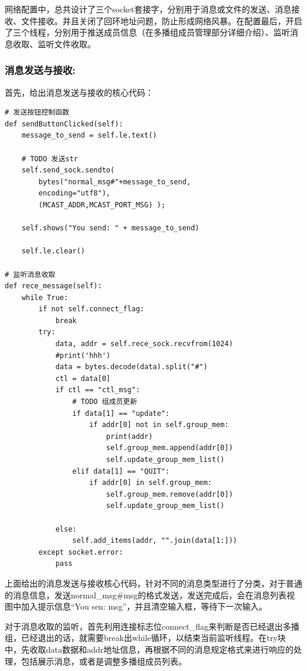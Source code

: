 \documentclass[UTF8]{ctexart}
\begin{document}
\par{网络配置中，总共设计了三个socket套接字，分别用于消息或文件的发送、消息接收、文件接收。并且关闭了回环地址问题，防止形成网络风暴。在配置最后，开启了三个线程，分别用于推送成员信息（在多播组成员管理部分详细介绍）、监听消息收取、监听文件收取。
}
\subsubsection{消息发送与接收:}{首先，给出消息发送与接收的核心代码：}
\par{
\begin{lstlisting}
# 发送按钮控制函数
def sendButtonClicked(self):
    message_to_send = self.le.text()

    # TODO 发送str
    self.send_sock.sendto(
    	bytes("normal_msg#"+message_to_send, 
    	encoding="utf8"), 
    	(MCAST_ADDR,MCAST_PORT_MSG) );

    self.shows("You send: " + message_to_send)

    self.le.clear()

# 监听消息收取
def rece_message(self):
    while True: 
        if not self.connect_flag:
            break
        try: 
            data, addr = self.rece_sock.recvfrom(1024) 
            #print('hhh')
            data = bytes.decode(data).split("#")
            ctl = data[0]
            if ctl == "ctl_msg":
                # TODO 组成员更新
                if data[1] == "update":
                    if addr[0] not in self.group_mem:
                        print(addr)
                        self.group_mem.append(addr[0])
                        self.update_group_mem_list()
                elif data[1] == "QUIT":
                    if addr[0] in self.group_mem:
                        self.group_mem.remove(addr[0])
                        self.update_group_mem_list()

            else:
                self.add_items(addr, "".join(data[1:]))
        except socket.error: 
            pass 
\end{lstlisting}
}
\par{上面给出的消息发送与接收核心代码，针对不同的消息类型进行了分类，对于普通的消息信息，发送normal\_msg\#msg的格式发送，发送完成后，会在消息列表视图中加入提示信息“You sen: msg”，并且清空输入框，等待下一次输入。}
\par{对于消息收取的监听，首先利用连接标志位connect\_flag来判断是否已经退出多播组，已经退出的话，就需要break出while循环，以结束当前监听线程。在try块中，先收取data数据和addr地址信息，再根据不同的消息规定格式来进行响应的处理，包括展示消息，或者是调整多播组成员列表。
}
\end{document}
